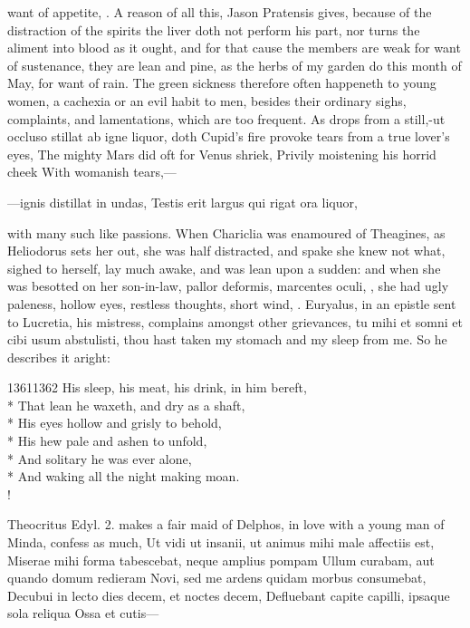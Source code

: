 want of appetite, \etc{}. A reason of all this, Jason Pratensis
gives, because of the distraction of the spirits the liver doth not
perform his part, nor turns the aliment into blood as it ought, and for
that cause the members are weak for want of sustenance, they are lean
and pine, as the herbs of my garden do this month of May, for want of
rain. The green sickness therefore often happeneth to young women, a
cachexia or an evil habit to men, besides their ordinary sighs,
complaints, and lamentations, which are too frequent. As drops from a
still,-ut occluso stillat ab igne liquor, doth Cupid's fire provoke
tears from a true lover's eyes,
The mighty Mars did oft for Venus shriek,
Privily moistening his horrid cheek
With womanish tears,---

---ignis distillat in undas,
Testis erit largus qui rigat ora liquor,

with many such like passions. When Chariclia was enamoured of
Theagines, as Heliodorus sets her out, she was half distracted,
and spake she knew not what, sighed to herself, lay much awake, and was
lean upon a sudden: and when she was besotted on her son-in-law,
pallor deformis, marcentes oculi, \etc{}, she had ugly paleness,
hollow eyes, restless thoughts, short wind, \etc{}. Euryalus, in an epistle
sent to Lucretia, his mistress, complains amongst other grievances, tu
mihi et somni et cibi usum abstulisti, thou hast taken my stomach and
my sleep from me. So he describes it aright:
%
{\gothfont%
\begin{versewithlinenos}{2}{1361}{1362}%
His sleep, his meat, his drink, in him bereft,\\*
That lean he waxeth, and dry as a shaft,\\*
His eyes hollow and grisly to behold,\\*
His hew pale and ashen to unfold,\\*
And solitary he was ever alone,\\*
And waking all the night making moan.\\!
\end{versewithlinenos}%
}%

Theocritus Edyl. 2. makes a fair maid of Delphos, in love with a young
man of Minda, confess as much,
Ut vidi ut insanii, ut animus mihi male affectiis est,
Miserae mihi forma tabescebat, neque amplius pompam
Ullum curabam, aut quando domum redieram
Novi, sed me ardens quidam morbus consumebat,
Decubui in lecto dies decem, et noctes decem,
Defluebant capite capilli, ipsaque sola reliqua
Ossa et cutis---

